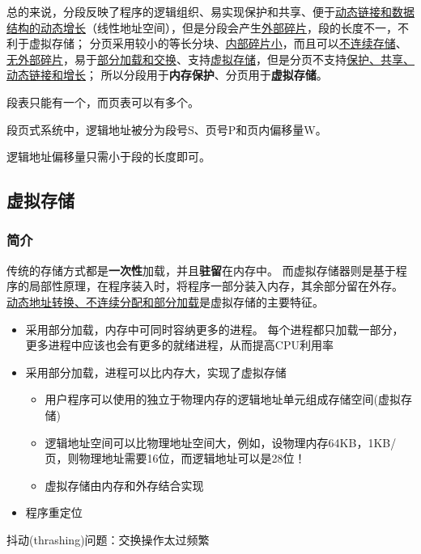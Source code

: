 总的来说，分段反映了程序的逻辑组织、易实现保护和共享、便于\underline{动态链接和数据结构的动态增长}（线性地址空间），但是分段会产生\underline{外部碎片}，段的长度不一，不利于虚拟存储；
分页采用较小的等长分块、\underline{内部碎片小}，而且可以\underline{不连续存储}、\underline{无外部碎片}，易于\underline{部分加载和交换}、支持\underline{虚拟存储}，但是分页不支持\underline{保护、共享、动态链接和增长}；
所以分段用于\textbf{内存保护}、分页用于\textbf{虚拟存储}。

段表只能有一个，而页表可以有多个。

段页式系统中，逻辑地址被分为段号S、页号P和页内偏移量W。

逻辑地址偏移量只需小于段的长度即可。

\subsection{虚拟存储}
\subsubsection{简介}
传统的存储方式都是\textbf{一次性}加载，并且\textbf{驻留}在内存中。
而虚拟存储器则是基于程序的局部性原理，在程序装入时，将程序一部分装入内存，其余部分留在外存。
\underline{动态地址转换、不连续分配和部分加载}是虚拟存储的主要特征。
\begin{itemize}
    \item 采用部分加载，内存中可同时容纳更多的进程。
每个进程都只加载一部分，更多进程中应该也会有更多的就绪进程，从而提高CPU利用率
    \item 采用部分加载，进程可以比内存大，实现了虚拟存储
    \begin{itemize}
\item 用户程序可以使用的独立于物理内存的逻辑地址单元组成存储空间(虚拟存储)
\item 逻辑地址空间可以比物理地址空间大，例如，设物理内存64KB，1KB/页，则物理地址需要16位，而逻辑地址可以是28位！
\item 虚拟存储由内存和外存结合实现
    \end{itemize}
    \item 程序重定位
\end{itemize}

抖动(thrashing)问题：交换操作太过频繁

